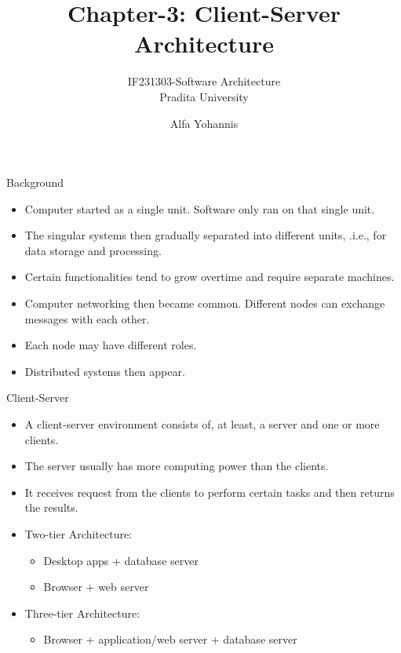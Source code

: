 \documentclass{beamer}
\title{Chapter-3: Client-Server Architecture}
\subtitle{IF231303-Software Architecture\\Pradita University}
\author{Alfa Yohannis}
\begin{document}
\begin{frame}[plain]
    \maketitle
\end{frame}

\begin{frame}{Background}
\begin{itemize}
\item Computer started as a single unit.  Software only ran on that single unit.
\item The singular systems then gradually separated into different units, .i.e., for data storage and processing.
\item Certain functionalities tend to grow overtime and require separate machines.
\item Computer networking then became common. Different nodes can exchange messages with each other.
\item Each node may have different roles.
\item Distributed systems then appear.
\end{itemize}
\end{frame}

\begin{frame}{Client-Server}
\begin{itemize}
\item A client-server environment consists of, at least, a server and one or more clients.
\item The server usually has more computing power than the clients. 
\item It receives request from the clients to perform certain tasks and then returns the results.
\item Two-tier Architecture:
\begin{itemize}
\item Desktop apps + database server
\item Browser + web server
\end{itemize}
\item Three-tier Architecture:
\begin{itemize}
\item Browser + application/web server + database server
\end{itemize}
\end{itemize}
\end{frame}
\end{document}

